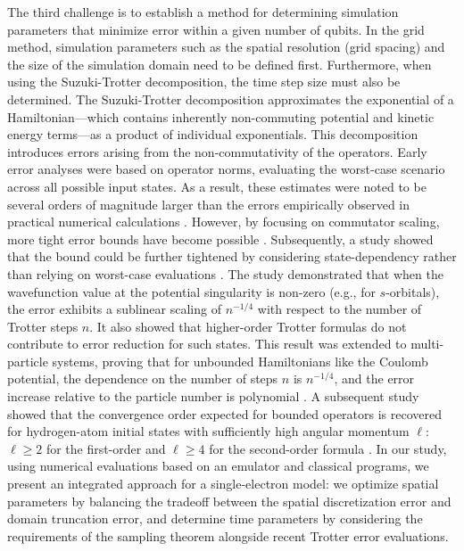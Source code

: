 \documentclass[aip-draft.tex]{subfiles}
\begin{document}
The third challenge is to establish a method for determining simulation
parameters that minimize error within a given number of qubits. In the grid
method, simulation parameters such as the spatial resolution (grid spacing) and
the size of the simulation domain need to be defined first. Furthermore, when
using the Suzuki-Trotter decomposition, the time step size must also be
determined. The Suzuki-Trotter decomposition approximates the exponential of a
Hamiltonian---which contains inherently non-commuting potential and kinetic
energy terms---as a product of individual exponentials. This decomposition
introduces errors arising from the non-commutativity of the operators. Early
error analyses were based on operator norms, evaluating the worst-case scenario
across all possible input states. As a result, these estimates were noted to be
several orders of magnitude larger than the errors empirically observed in
practical numerical calculations \cite{Childs2021.PhysRevX.11.011020}. However,
by focusing on commutator scaling, more tight error bounds have become possible
\cite{Childs2021.PhysRevX.11.011020}. Subsequently, a study showed that the
bound could be further tightened by considering state-dependency rather than
relying on worst-case evaluations \cite{Burgarth2024.PhysRevResearch.6.043155}.
The study demonstrated that when the wavefunction value at the potential
singularity is non-zero (e.g., for $s$-orbitals), the error exhibits a sublinear
scaling of $n^{-1/4}$ with respect to the number of Trotter steps $n$. It also
showed that higher-order Trotter formulas do not contribute to error reduction
for such states. This result was extended to multi-particle systems, proving
that for unbounded Hamiltonians like the Coulomb potential, the dependence on
the number of steps $n$ is $n^{-1/4}$, and the error increase relative to the
particle number is polynomial \cite{fang2026trotter}. A subsequent study showed
that the convergence order expected for bounded operators is recovered for
hydrogen-atom initial states with sufficiently high angular momentum $\ell$:
$\ell\ge 2$ for the first-order and $\ell \ge 4$ for the second-order
formula \cite{fangwu2026trotterization}. In our study, using numerical
evaluations based on an emulator and classical programs, we present an
integrated approach for a single-electron model: we optimize spatial parameters
by balancing the tradeoff between the spatial discretization error and domain
truncation error, and determine time parameters by considering the requirements
of the sampling theorem alongside recent Trotter error evaluations.

\ifSubfilesClassLoaded{}{}
\end{document}
